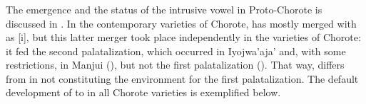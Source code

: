 \begin{exe}
    \ex {}
    \ex {}
    \ex {}
    \ex {}
    \ex {}
    \ex {}
    \ex {}
    \ex {}
    \ex {}
\end{exe}

\subsubsection{}\label{ch-schwa-dial}

The emergence and the status of the intrusive vowel  in Proto-Chorote is discussed in . In the contemporary varieties of Chorote,  has mostly merged with  as [i], but this latter merger took place independently in the varieties of Chorote: it fed the second palatalization, which occurred in Iyojwa’aja’ and, with some restrictions, in Manjui (), but not the first palatalization (). That way,  differs from  in not constituting the environment for the first palatalization. The default development of  to  in all Chorote varieties is exemplified below.

